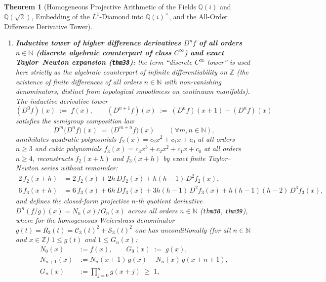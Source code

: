 \documentclass[11pt,a4paper]{article}
\theoremstyle{plain}
\newtheorem{theorem}{Theorem}[section]
\theoremstyle{definition}
\begin{document}
\begin{theorem}[Homogeneous Projective Arithmetic of the Fields $\mathbb{Q}(i)$ and $\mathbb{Q}(\sqrt{2})$, Embedding of the $L^1$-Diamond into $\mathbb{Q}(i)^\times$, and the All-Order Difference Derivative Tower]
\begin{enumerate}[label=\textbf{(\roman*)},leftmargin=*]
\item \textbf{Inductive tower of higher difference derivatives $D^n f$ of all orders $n \in \mathbb{N}$ (discrete algebraic counterpart of class $C^\infty$) and exact Taylor--Newton expansion (\texttt{thm38}):}
  the term ``discrete $C^\infty$ tower'' is used here strictly as the algebraic counterpart of infinite differentiability on $\mathbb{Z}$ (the existence of finite differences of all orders $n \in \mathbb{N}$ with non-vanishing denominators, distinct from topological smoothness on continuum manifolds). The inductive derivative tower
  \begin{equation}
    \label{eq:field-deriv-n-def}
    (D^0 f)(x) \;:=\; f(x),
    \qquad
    (D^{n+1} f)(x) \;:=\; (D^n f)(x+1) - (D^n f)(x)
  \end{equation}
  satisfies the semigroup composition law
  \begin{equation}
    \label{eq:field-deriv-composition}
    D^m\bigl(D^n f\bigr)(x) \;=\; \bigl(D^{m+n} f\bigr)(x)
    \qquad (\forall m, n \in \mathbb{N}),
  \end{equation}
  annihilates quadratic polynomials $f_2(x) = c_2 x^2 + c_1 x + c_0$ at all orders $n \ge 3$ and cubic polynomials $f_3(x) = c_3 x^3 + c_2 x^2 + c_1 x + c_0$ at all orders $n \ge 4$, reconstructs $f_2(x+h)$ and $f_3(x+h)$ by exact finite Taylor--Newton series without remainder:
  \begin{align}
    2\,f_2(x+h) &= 2\,f_2(x) + 2h\,Df_2(x) + h(h-1)\,D^2f_2(x), \label{eq:taylor-newton-quad} \\
    6\,f_3(x+h) &= 6\,f_3(x) + 6h\,Df_3(x) + 3h(h-1)\,D^2f_3(x) + h(h-1)(h-2)\,D^3f_3(x), \label{eq:taylor-newton-cubic}
  \end{align}
  and defines the closed-form projective $n$-th quotient derivative $D^n(f/g)(x) = N_n(x) / G_n(x)$ across all orders $n \in \mathbb{N}$ (\texttt{thm38}, \texttt{thm39}), where for the homogeneous Weierstrass denominator $g(t) = R_3(t) = \mathcal{C}_3(t)^2 + \mathcal{S}_3(t)^2$ one has unconditionally (for all $n \in \mathbb{N}$ and $x \in \mathbb{Z}$) $1 \le g(t)$ and $1 \le G_n(x)$:
  \begin{align}
    N_0(x) &:= f(x), \qquad G_0(x) \;:=\; g(x), \label{eq:quotient-deriv-n-base} \\
    N_{n+1}(x) &:= N_n(x+1)\,g(x) - N_n(x)\,g(x+n+1), \label{eq:quotient-deriv-n-numer} \\
    G_n(x) &:= \prod_{j=0}^{n} g(x+j) \;\ge\; 1, \label{eq:c-infinity-denom-pos}
  \end{align}

\end{enumerate}
\end{theorem}
\end{document}
